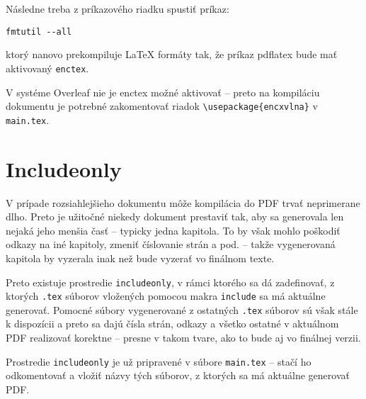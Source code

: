 Následne treba z príkazového riadku spustiť príkaz:
\begin{Verbatim}
fmtutil --all
\end{Verbatim}
ktorý nanovo prekompiluje LaTeX formáty tak, že príkaz pdflatex bude mať aktivovaný \texttt{enctex}.

V systéme Overleaf nie je enctex možné aktivovať -- preto na kompiláciu dokumentu je potrebné zakomentovať riadok \texttt{\textbackslash{usepackage}\{encxvlna\}} v \texttt{main.tex}.

\section{Includeonly}

V prípade rozsiahlejšieho dokumentu môže kompilácia do PDF trvať neprimerane dlho. Preto je užitočné niekedy dokument prestaviť tak, aby sa generovala len nejaká jeho menšia časť -- typicky jedna kapitola. To by však mohlo poškodiť odkazy na iné kapitoly, zmeniť číslovanie strán a pod. -- takže vygenerovaná kapitola by vyzerala inak než bude vyzerať vo finálnom texte.

Preto existuje prostredie \texttt{includeonly}, v rámci ktorého sa dá zadefinovať, z ktorých \texttt{.tex} súborov vložených pomocou makra \texttt{include} sa má aktuálne generovať. Pomocné súbory vygenerované z ostatných \texttt{.tex} súborov sú však stále k dispozícii a preto sa dajú čísla strán, odkazy a všetko ostatné v aktuálnom PDF realizovať korektne -- presne v takom tvare, ako to bude aj vo finálnej verzii.

Prostredie \texttt{includeonly} je už pripravené v súbore \texttt{main.tex} -- stačí ho odkomentovať a vložiť názvy tých súborov, z ktorých sa má aktuálne generovať PDF.

